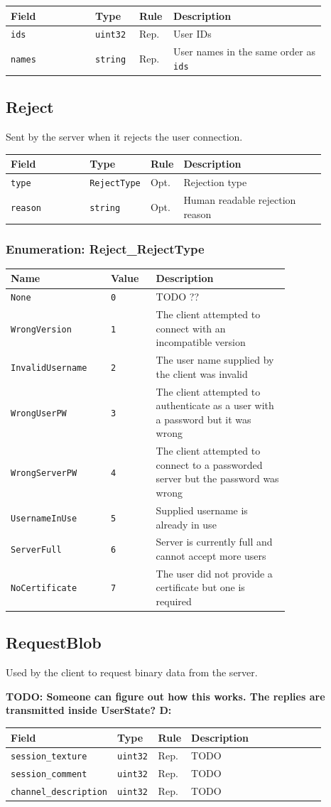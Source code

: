 \documentclass[11pt]{article} %
\newenvironment{mumbleMessageEx}
{%
	\small
	\renewcommand\arraystretch{1.5}
	\begin{tabular}{p{0.25\linewidth}p{0.13\linewidth}p{0.05\linewidth}p{0.45\linewidth}}
	Field & Type & Rule & Description \\
	\hline
}
{%
	\end{tabular}
	\renewcommand\arraystretch{1.0}
}
\newcommand{\mumbleMessageExItem}[4]{ \texttt{#1} & \texttt{#2} & #3 & #4 \\ }
\newenvironment{mumbleEnum}
{%
	\small
	\renewcommand\arraystretch{1.5}
	\begin{tabular}{p{0.25\linewidth}p{0.13\linewidth}p{0.4\linewidth}}
	Name & Value & Description \\
	\hline
}
{%
	\end{tabular}
	\renewcommand\arraystretch{1.0}
}
\newcommand{\mumbleEnumItem}[3]{ \texttt{#1} & \texttt{#2} & #3 \\ }
\begin{document}
\begin{mumbleMessageEx}
\mumbleMessageExItem{ids}{uint32}{Rep.}{User IDs}
\mumbleMessageExItem{names}{string}{Rep.}{User names in the same order as \texttt{ids}}
\end{mumbleMessageEx}

\subsection{Reject}
\label{msg:reject}

Sent by the server when it rejects the user connection.

\begin{mumbleMessageEx}
\mumbleMessageExItem{type}{RejectType}{Opt.}{Rejection type}
\mumbleMessageExItem{reason}{string}{Opt.}{Human readable rejection reason}
\end{mumbleMessageEx}

\subsubsection{Enumeration: Reject\_RejectType}
\label{msg:reject:rejectType}

\begin{mumbleEnum}
\mumbleEnumItem{None}{0}{TODO ??}
\mumbleEnumItem{WrongVersion}{1}{The client attempted to connect with an incompatible version}
\mumbleEnumItem{InvalidUsername}{2}{The user name supplied by the client was invalid}
\mumbleEnumItem{WrongUserPW}{3}{The client attempted to authenticate as a user with a password but it was wrong}
\mumbleEnumItem{WrongServerPW}{4}{The client attempted to connect to a passworded server but the password was wrong}
\mumbleEnumItem{UsernameInUse}{5}{Supplied username is already in use}
\mumbleEnumItem{ServerFull}{6}{Server is currently full and cannot accept more users}
\mumbleEnumItem{NoCertificate}{7}{The user did not provide a certificate but one is required}
\end{mumbleEnum}

\subsection{RequestBlob}
\label{msg:requestBlob}

Used by the client to request binary data from the server.

\textbf{TODO: Someone can figure out how this works. The replies are transmitted inside UserState? D:}

\begin{mumbleMessageEx}
\mumbleMessageExItem{session\_texture}{uint32}{Rep.}{TODO}
\mumbleMessageExItem{session\_comment}{uint32}{Rep.}{TODO}
\mumbleMessageExItem{channel\_description}{uint32}{Rep.}{TODO}
\end{mumbleMessageEx}
\end{document}
